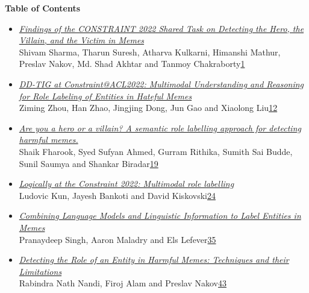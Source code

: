 \documentclass[11pt,oneside]{book}
\begin{document}
\newpage  %
\pagestyle{plain}
\begin{center}
{\Large \textbf{Table of Contents}}
\end{center}
\vspace*{1em}
\newcommand\page[1]{\rightskip=25pt \dotfill\rlap{\hbox to 25pt{\hfill#1}}\par}
\begin{itemize}[leftmargin=*,label={}]
       \item \hyperlink{page.1}{\emph{Findings of the CONSTRAINT 2022 Shared Task on Detecting the Hero, the Villain, and the Victim in Memes}}\\ \hspace*{2em} Shivam Sharma, Tharun Suresh, Atharva Kulkarni, Himanshi Mathur, Preslav Nakov, Md. Shad Akhtar and Tanmoy Chakraborty\dotfill \hyperlink{page.1}{1}
       \item \hyperlink{page.12}{\emph{DD-TIG at Constraint@ACL2022: Multimodal Understanding and Reasoning for Role Labeling of Entities in Hateful Memes}}\\ \hspace*{2em} Ziming Zhou, Han Zhao, Jingjing Dong, Jun Gao and Xiaolong Liu\dotfill \hyperlink{page.12}{12}
       \item \hyperlink{page.19}{\emph{Are you a hero or a villain? A semantic role labelling approach for detecting harmful memes.}}\\ \hspace*{2em} Shaik Fharook, Syed Sufyan Ahmed, Gurram Rithika, Sumith Sai Budde, Sunil Saumya and Shankar Biradar\dotfill \hyperlink{page.19}{19}
       \item \hyperlink{page.24}{\emph{Logically at the Constraint 2022: Multimodal role labelling}}\\ \hspace*{2em} Ludovic Kun, Jayesh Bankoti and David Kiskovski\dotfill \hyperlink{page.24}{24}
       \item \hyperlink{page.35}{\emph{Combining Language Models and Linguistic Information to Label Entities in Memes}}\\ \hspace*{2em} Pranaydeep Singh, Aaron Maladry and Els Lefever\dotfill \hyperlink{page.35}{35}
       \item \hyperlink{page.43}{\emph{Detecting the Role of an Entity in Harmful Memes: Techniques and their Limitations}}\\ \hspace*{2em} Rabindra Nath Nandi, Firoj Alam and Preslav Nakov\dotfill \hyperlink{page.43}{43}

\end{itemize}
\end{document}
